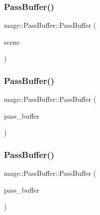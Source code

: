 \subsubsection{\texorpdfstring{Pass\+Buffer()}{PassBuffer()}\hspace{0.1cm}{\footnotesize\ttfamily [1/3]}}
{\footnotesize\ttfamily mage\+::\+Pass\+Buffer\+::\+Pass\+Buffer (\begin{DoxyParamCaption}\item[{const \hyperlink{classmage_1_1_scene}{Scene} $\ast$}]{scene }\end{DoxyParamCaption})\hspace{0.3cm}{\ttfamily [explicit]}}

\hypertarget{structmage_1_1_pass_buffer_a1c6e779725227ebbb8e3d15a4515edbc}{}\label{structmage_1_1_pass_buffer_a1c6e779725227ebbb8e3d15a4515edbc} 
\subsubsection{\texorpdfstring{Pass\+Buffer()}{PassBuffer()}\hspace{0.1cm}{\footnotesize\ttfamily [2/3]}}
{\footnotesize\ttfamily mage\+::\+Pass\+Buffer\+::\+Pass\+Buffer (\begin{DoxyParamCaption}\item[{const \hyperlink{structmage_1_1_pass_buffer}{Pass\+Buffer} \&}]{pass\+\_\+buffer }\end{DoxyParamCaption})\hspace{0.3cm}{\ttfamily [default]}}

\hypertarget{structmage_1_1_pass_buffer_a8f6baa279c6dc8c5b6869240d0169677}{}\label{structmage_1_1_pass_buffer_a8f6baa279c6dc8c5b6869240d0169677} 
\subsubsection{\texorpdfstring{Pass\+Buffer()}{PassBuffer()}\hspace{0.1cm}{\footnotesize\ttfamily [3/3]}}
{\footnotesize\ttfamily mage\+::\+Pass\+Buffer\+::\+Pass\+Buffer (\begin{DoxyParamCaption}\item[{\hyperlink{structmage_1_1_pass_buffer}{Pass\+Buffer} \&\&}]{pass\+\_\+buffer }\end{DoxyParamCaption})\hspace{0.3cm}{\ttfamily [default]}}

